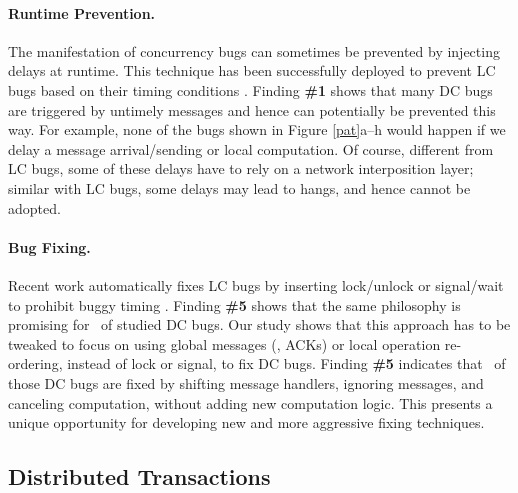 \paragraph{Runtime Prevention.}

The manifestation of 
concurrency bugs can sometimes be prevented by
injecting delays at runtime.  This technique has been successfully
deployed to prevent LC bugs based on their timing
conditions \cite{DeadlockImmunity, avisio,conair.asplos13}.
%
%
Finding {\bf \#1} shows that many DC bugs are triggered by untimely
messages and hence can potentially be prevented this way.  For
example, none of the bugs shown in Figure \ref{pat}a--h would happen
if we delay a message arrival/sending or local computation.  Of
course, different from LC bugs, some of these delays have to rely on a
network interposition layer; similar with LC bugs, some
delays may lead to hangs, and hence cannot be adopted.



\paragraph{Bug Fixing.}

Recent work automatically fixes LC bugs by inserting lock/unlock or
signal/wait to prohibit buggy timing \cite{cfix.osdi12,
  grail.fse14, wang.osdi08}.
%
%
Finding {\bf \#5} shows that the same philosophy is promising for
\pctFixTime\ of studied DC bugs. Our study 
shows that this approach has to be tweaked to focus on using global
messages (\eg, ACKs) or local operation re-ordering, instead of lock
or signal, to fix DC bugs.  Finding {\bf \#5} indicates that
\pctFixHandEasy\ of those DC bugs are fixed by shifting message handlers,
ignoring messages, and canceling computation, without adding new
computation logic.  This presents a unique opportunity for developing
new and more aggressive fixing techniques.

\subsection{Distributed Transactions}
\label{less-tx}




